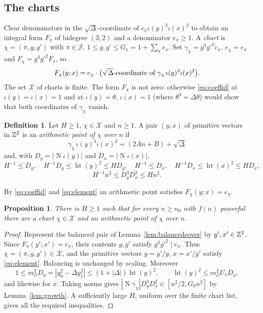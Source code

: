 \documentclass[11pt,reqno]{amsart}
\newtheorem{proposition}[theorem]{Proposition}
\theoremstyle{definition}
\newtheorem{definition}[theorem]{Definition}
\theoremstyle{remark}
\numberwithin{equation}{section}
\newcommand{\OO}{\mathcal O}
\newcommand{\Nm}{\operatorname{N}}
\newcommand{\hgt}{\operatorname{ht}}
\begin{document}
\subsection{The charts}
Clear denominators in the $\sqrt\Delta$-coordinate of
$c_\pi\iota(y)^3\iota(x)^2$ to obtain an integral form $F_\pi$
of bidegree $(3,2)$ and a denominator $e_\pi\ge1$.
A \emph{chart} is $\chi=(\pi,g,g')$ with $\pi\in\mathcal J$,
$1\le g,g'\le G_1=1+\sum_\pi e_\pi$. Set
$\gamma_\chi=g^3g'^2c_\pi$, $e_\chi=e_\pi$ and
$F_\chi=g^3g'^2F_\pi$, so
\begin{equation}\label{eq:coeffid}
 F_\chi(y;x)=e_\chi\cdot\bigl(\sqrt\Delta\textnormal{-coordinate of }
 \gamma_\chi\,\iota(y)^3\iota(x)^2\bigr).
\end{equation}
The set $\mathcal X$ of charts is finite. The form $F_\chi$ is not zero:
otherwise \eqref{eq:coeffid} at $\iota(y)=\iota(x)=1$ and at
$\iota(y)=\theta$, $\iota(x)=1$ (where $\theta^3=\Delta\theta$) would show
that both coordinates of $\gamma_\chi$ vanish.

\begin{definition}\label{def:point}
Let $H\ge1$, $\chi\in\mathcal X$ and $n\ge1$. A pair $(y,x)$ of primitive
vectors in $\mathbb Z^2$ is an \emph{arithmetic point of $\chi$ over $n$} if
\begin{equation}\label{eq:element}
 \gamma_\chi\,\iota(y)^3\iota(x)^2=(2An+B)+\sqrt\Delta
\end{equation}
and, with $D_y=|\Nm\iota(y)|$ and $D_x=|\Nm\iota(x)|$,
\[
 H^{-1}\le D_y,\quad H^{-1}D_y\le\hgt(y)^2\le HD_y,\quad
 H^{-1}\le D_x,\quad H^{-1}D_x\le\hgt(x)^2\le HD_x,
\]
\[
 H^{-1}n^2\le D_y^3D_x^2\le Hn^2 .
\]
\end{definition}
By \eqref{eq:coeffid} and \eqref{eq:element} an arithmetic point satisfies
$F_\chi(y;x)=e_\chi$.

\begin{proposition}\label{prop:charts}
There is $H\ge1$ such that for every $n\ge n_0$ with $f(n)$ powerful there
are a chart $\chi\in\mathcal X$ and an arithmetic point of $\chi$ over $n$.
\end{proposition}
\begin{proof}
Represent the balanced pair of Lemma~\ref{lem:balancedcover} by
$y',x'\in\mathbb Z^2$. Since $F_\pi(y';x')=e_\pi$, their contents $g,g'$ satisfy
$g^3g'^2\mid e_\pi$. Thus $\chi=(\pi,g,g')\in\mathcal X$, and the
primitive vectors $y=y'/g$, $x=x'/g'$ satisfy \eqref{eq:element}.
Balancing is unchanged by scaling. Moreover
\[
 1\le m_{\OO}^2D_y=|y_0^2-\Delta y_1^2|
 \le(1+|\Delta|)\hgt(y)^2,
 \qquad \hgt(y)^2\le m_{\OO}^2U_1D_y,
\]
and likewise for $x$. Taking norms gives
$|\Nm\gamma_\chi|D_y^3D_x^2\in[n^2/2,G_0n^2]$ by
Lemma~\ref{lem:growth}. A sufficiently large $H$, uniform over the
finite chart list, gives all the required inequalities.
\end{proof}
\end{document}
